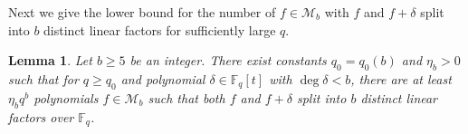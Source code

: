 \documentclass[11pt,a4paper]{article}
\newtheorem{lemma}[theorem]{Lemma}
\theoremstyle{definition}
\theoremstyle{remark}
\newcommand{\F}{\mathbb{F}}
\begin{document}



Next we give the lower bound for the number of $f \in \mathcal{M}_b$ with $f$ and $f+\delta$ split into $b$ distinct linear factors for sufficiently large $q$.
 

\begin{lemma} \label{lem:double-shift}
Let $b \geq 5$ be an integer. There exist constants $q_0=q_0(b)$ and $\eta_b > 0$ such 
that for $q \geq q_0$ and polynomial 
$\delta \in \F_q[t]$ with $\deg \delta < b$, there are at least $\eta_b q^b$ polynomials 
$f \in \mathcal{M}_b$ such that both $f$ and $f + \delta$ split into $b$ 
distinct linear factors over $\F_q$.
\end{lemma}
\end{document}
